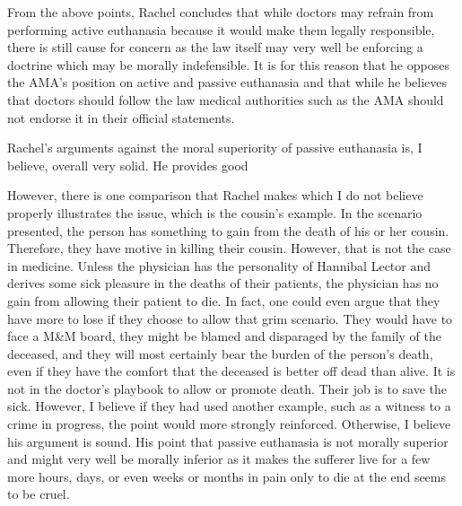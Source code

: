 \documentclass{article}
\begin{document}
From the above points, Rachel concludes that while doctors may refrain from performing
active euthanasia because it would make them legally responsible, there is still cause
for concern as the law itself may very well be enforcing a doctrine which may be morally
indefensible. It is for this reason that he opposes the AMA's position on active and
passive euthanasia and that while he believes that doctors should follow the law
medical authorities such as the AMA should not endorse it in their official statements.

Rachel's arguments against the moral superiority of passive euthanasia is, I believe,
overall very solid. He provides good 

However, there is one comparison that Rachel makes which I do not believe properly
illustrates the issue, which is the cousin's example. In the scenario presented, the
person has something to gain from the death of his or her cousin. Therefore, they have
motive in killing their cousin. However, that is not the case in medicine. Unless the
physician has the personality of Hannibal Lector and derives some sick pleasure in
the deaths of their patients, the physician has no gain from allowing their patient to
die. In fact, one could even argue that they have more to lose if they choose to allow
that grim scenario. They would have to face a M\&M board, they might be blamed and 
disparaged by the family of the deceased, and they will most certainly bear the burden
of the person's death, even if they have the comfort that the deceased is better off dead
than alive. It is not in the doctor's playbook to allow or promote death. Their job
is to save the sick. However, I believe if they had used another example, such as a
witness to a crime in progress, the point would more strongly reinforced. Otherwise,
I believe his argument is sound. His point that passive euthanasia is not morally superior
and might very well be morally inferior as it makes the sufferer live for a few more
hours, days, or even weeks or months in pain only to die at the end seems to be cruel.
\end{document}
